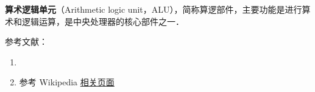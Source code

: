 
\begin{issues}
\issueDraft
\end{issues}

\textbf{算术逻辑单元}（Arithmetic logic unit，ALU），简称算逻部件，主要功能是进行算术和逻辑运算，是中央处理器的核心部件之一．

参考文献：
\begin{enumerate}
\item \cite{唐计}
\item 参考 Wikipedia \href{https://en.wikipedia.org/wiki/Arithmetic_logic_unit}{相关页面}
\end{enumerate}
